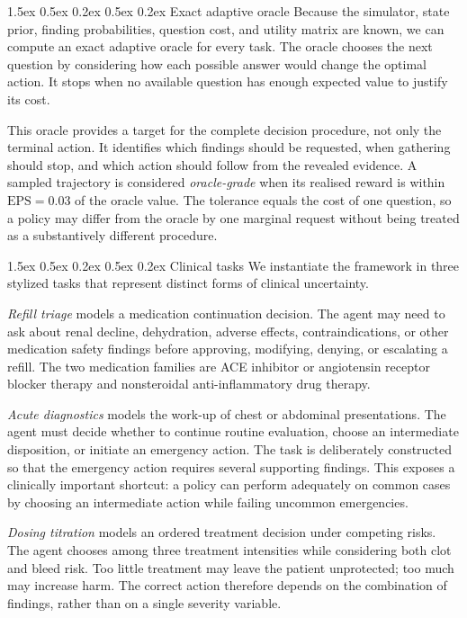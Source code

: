 \documentclass{article}
\makeatletter
\renewcommand{\paragraph}{%
  \@startsection{paragraph}{4}{\z@}%
                {1.5ex \@plus 0.5ex \@minus 0.2ex}%
                {0.5ex \@plus 0.2ex}%
                {\normalsize\bf}}
\makeatother
\begin{document}
\paragraph{Exact adaptive oracle}
Because the simulator, state prior, finding probabilities, question cost, and
utility matrix are known, we can compute an exact adaptive oracle for every task.
The oracle chooses the next question by considering how each possible answer would
change the optimal action. It stops when no available question has enough expected
value to justify its cost.

This oracle provides a target for the complete decision procedure, not only the
terminal action. It identifies which findings should be requested, when gathering
should stop, and which action should follow from the revealed evidence. A sampled
trajectory is considered \emph{oracle-grade} when its realised reward is within
$\text{EPS}{=}0.03$ of the oracle value. The tolerance equals the cost of one question, so a policy may differ from the oracle by one marginal request without
being treated as a substantively different procedure.

\paragraph{Clinical tasks}
We instantiate the framework in three stylized tasks that represent distinct forms
of clinical uncertainty.

\emph{Refill triage} models a medication continuation decision. The agent may need
to ask about renal decline, dehydration, adverse effects, contraindications, or
other medication safety findings before approving, modifying, denying, or
escalating a refill. The two medication families are ACE inhibitor or angiotensin
receptor blocker therapy and nonsteroidal anti-inflammatory drug therapy.

\emph{Acute diagnostics} models the work-up of chest or abdominal presentations.
The agent must decide whether to continue routine evaluation, choose an
intermediate disposition, or initiate an emergency action. The task is deliberately
constructed so that the emergency action requires several supporting findings.
This exposes a clinically important shortcut: a policy can perform adequately on
common cases by choosing an intermediate action while failing uncommon emergencies.

\emph{Dosing titration} models an ordered treatment decision under competing risks.
The agent chooses among three treatment intensities while considering both clot and
bleed risk. Too little treatment may leave the patient unprotected; too much may
increase harm. The correct action therefore depends on the combination of findings,
rather than on a single severity variable.
\end{document}

